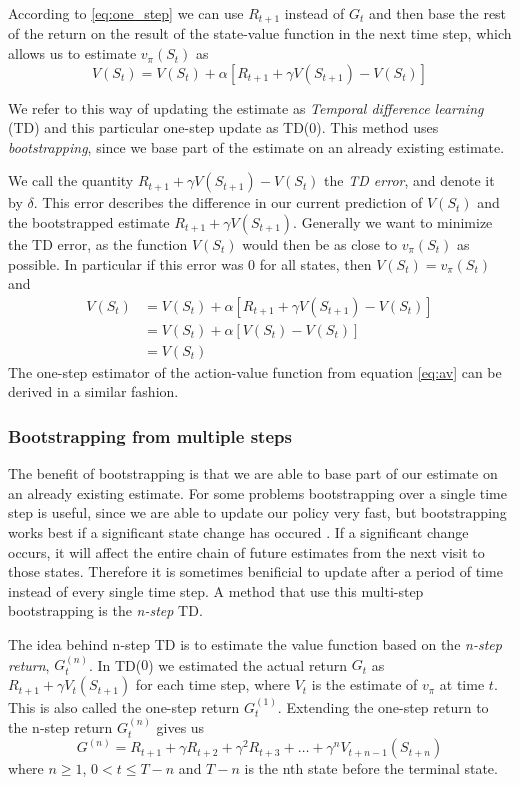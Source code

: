 \documentclass[11pt]{article}
\begin{document}
According to \ref{eq:one_step} we can use $R_{t+1}$ instead of $G_t$
and then base the rest of the return on the result of the state-value
function in the next time step, which allows us to estimate $v_\pi(S_t)$ as
\begin{equation}
    V(S_t) = V(S_t) + \alpha  [R_{t+1} + \gamma  V(S_{t+1}) - V(S_t)]
\end{equation}

We refer to this way of updating the estimate as
\textit{Temporal difference learning} (TD) and this particular one-step
update as TD($0$)\cite{RLbook}.
This method uses \textit{bootstrapping}, since we base
part of the estimate on an already existing estimate.

We call the quantity $R_{t+1} + \gamma  V(S_{t+1}) - V(S_t)$
the \textit{TD error}, and denote it by $\delta$.
This error describes the difference in our current prediction of 
$V(S_t)$ and the bootstrapped estimate $R_{t+1} + \gamma 
V(S_{t+1})$.
Generally we want to minimize the TD error, as the function $V(S_t)$
would then be as close to $v_\pi(S_t)$ as possible.
In particular if this error was 0 for all states, then
$V(S_t) = v_\pi(S_t)$ and
\begin{align}
   V(S_t)  & = V(S_t) + \alpha  [R_{t+1} + \gamma  V(S_{t+1}) - V(S_t)]   \\
           & = V(S_t) + \alpha  [V(S_t) - V(S_t)]  \\
           & = V(S_t) 
\end{align}
The one-step estimator of the action-value function from equation
\ref{eq:av} can be derived in a similar fashion.

\subsubsection{Bootstrapping from multiple steps}

The benefit of bootstrapping is that we are able to base part of our estimate on
an already existing estimate.
For some problems bootstrapping over a single time step is useful, since
we are able to update our policy very fast,
but bootstrapping works best if a significant state change has occured
\cite{RLbook}.
If a significant change occurs, it will affect the entire chain
of future estimates from the next visit to those states.
Therefore it is sometimes benificial to update after a period of time
instead of every single time step.
A method that use this multi-step bootstrapping is the \textit{n-step}
TD.

The idea behind n-step TD is to estimate the value function
based on the \textit{n-step return}, $G^{(n)}_t$.
In TD($0$) we estimated the actual return $G_t$ as
$R_{t+1} + \gamma  V_t(S_{t+1})$ for each time step,
where $V_t$ is the estimate of $v_\pi$ at time $t$.
This is also called the one-step return $G^{(1)}_t$.
Extending the one-step return to the n-step return $G^{(n)}_t$ gives us
\begin{equation}
        G^{(n)} = R_{t+1} + \gamma  R_{t+2} + \gamma^2  R_{t+3} + \dots + \gamma^n  V_{t+n-1}(S_{t+n})
\end{equation}
where $n \geq 1$, $0 < t \leq T - n$ and $T - n$ is the nth state before the terminal
state\cite{RLbook}.
\end{document}
